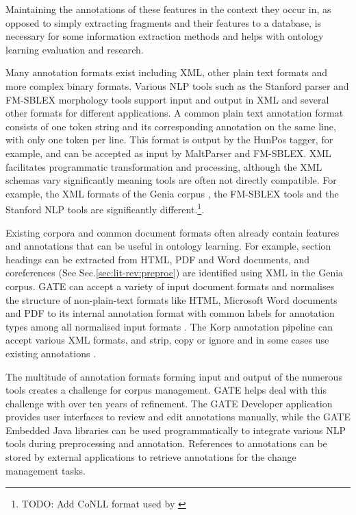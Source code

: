 \documentclass[a4paper]{report}
\newcommand{\todo}[1]{\footnote{{\color{red} TODO: #1}}}
\begin{document}
Maintaining the annotations of these features in the context they occur in, as opposed to simply extracting fragments and their features to a database, is necessary for some information extraction methods\citep{Frantzi98CNCValue, NenadicEtAl02TermSim, Srikant95GenAssocRul} and helps with ontology learning evaluation and research.

Many annotation formats exist including XML, other plain text formats and more complex binary formats.
Various NLP tools such as the Stanford parser \citep{Marneffe06StanfPars} and FM-SBLEX morphology tools support input and output in XML and several other formats for different applications.
A common plain text annotation format consists of one token string and its corresponding annotation on the same line, with only one token per line.
This format is output by the HunPos tagger, for example, and can be accepted as input by MaltParser\citep{Nivre06maltparser} and FM-SBLEX.
XML facilitates programmatic transformation and processing, although the XML schemas vary significantly meaning tools are often not directly compatible.
For example, the XML formats of the Genia corpus \citep{KimEtAl03GeniaCorpus}, the FM-SBLEX tools and the Stanford NLP tools are significantly different.\todo{Add CoNLL format\citep{NivreEtAl07NoNLL} used by \citep{Nivre06maltparser}}.

Existing corpora and common document formats often already contain features and annotations that can be useful in ontology learning.
For example, section headings can be extracted from HTML, PDF and Word documents, and coreferences (See Sec.\ref{sec:lit-rev:preproc}) are identified using XML in the Genia corpus.
GATE can accept a variety of input document formats and normalises the structure of non-plain-text formats like HTML, Microsoft Word documents and PDF to its internal annotation format with common labels for annotation types among all normalised input formats \citep{Cunningham2011GATEBook}.
The Korp annotation pipeline can accept various XML formats, and strip, copy or ignore and in some cases use existing annotations \cite{Borin12Korp}.

The multitude of annotation formats forming input and output of the numerous tools creates a challenge for corpus management.
GATE helps deal with this challenge with over ten years of refinement.
The GATE Developer application provides user interfaces to review and edit annotations manually, while the GATE Embedded Java libraries can be used programmatically to integrate various NLP tools during preprocessing and annotation.
References to annotations can be stored by external applications to retrieve annotations for the change management tasks.
\end{document}
